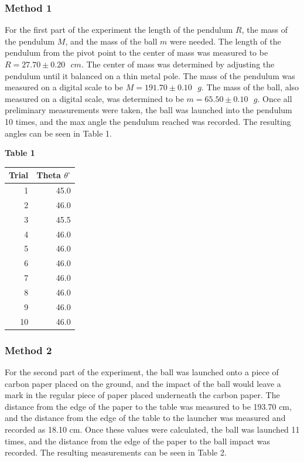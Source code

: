 \documentclass[11pt]{article}
\begin{document}
\hypertarget{method-1-1}{%
\subsubsection*{\centering Method 1}\label{method-1-1}}

For the first part of the experiment the length of the pendulum \(R\),
the mass of the pendulum \(M\), and the mass of the ball \(m\) were
needed. The length of the pendulum from the pivot point to the center of
mass was measured to be \(R=27.70 \pm 0.20\text{ }cm\). The center of
mass was determined by adjusting the pendulum until it balanced on a
thin metal pole. The mass of the pendulum was measured on a digital
scale to be \(M = 191.70 \pm 0.10\text{ }g\). The mass of the ball, also
measured on a digital scale, was determined to be
\(m = 65.50 \pm 0.10\text{ }g\). Once all preliminary measurements were
taken, the ball was launched into the pendulum 10 times, and the max
angle the pendulum reached was recorded. The resulting angles can be
seen in Table 1.

\begin{center}
\textbf{Table 1}

\begin{tabular}{rr}
\toprule
 Trial &  Theta $\theta^{\circ}$ \\
\midrule
     1 &                    45.0 \\
     2 &                    46.0 \\
     3 &                    45.5 \\
     4 &                    46.0 \\
     5 &                    46.0 \\
     6 &                    46.0 \\
     7 &                    46.0 \\
     8 &                    46.0 \\
     9 &                    46.0 \\
    10 &                    46.0 \\
\bottomrule
\end{tabular}
\end{center}

\hypertarget{method-2-1}{%
\subsubsection*{\centering Method 2}\label{method-2-1}}

For the second part of the experiment, the ball was launched onto a
piece of carbon paper placed on the ground, and the impact of the ball
would leave a mark in the regular piece of paper placed underneath the
carbon paper. The distance from the edge of the paper to the table was measured
to be 193.70 cm, and the distance from the edge of the table to the
launcher was measured and recorded as 18.10 cm. Once these values were
calculated, the ball was launched 11 times, and the distance from the
edge of the paper to the ball impact was recorded. The resulting
measurements can be seen in Table 2.
\end{document}
